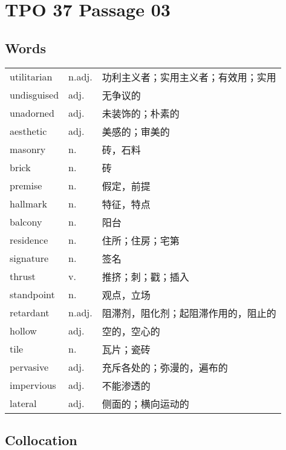 \section{TPO 37 Passage 03}

\subsection{Words}

\begin{tabular}{lll}
    utilitarian & n.adj. & 功利主义者；实用主义者；有效用；实用 \\
    undisguised & adj.   & 无争议的               \\
    unadorned   & adj.   & 未装饰的；朴素的           \\
    aesthetic   & adj.   & 美感的；审美的            \\
    masonry     & n.     & 砖，石料               \\
    brick       & n.     & 砖                  \\
    premise     & n.     & 假定，前提              \\
    hallmark    & n.     & 特征，特点              \\
    balcony     & n.     & 阳台                 \\
    residence   & n.     & 住所；住房；宅第           \\
    signature   & n.     & 签名                 \\
    thrust      & v.     & 推挤；刺；戳；插入          \\
    standpoint  & n.     & 观点，立场              \\
    retardant   & n.adj. & 阻滞剂，阻化剂；起阻滞作用的，阻止的 \\
    hollow      & adj.   & 空的，空心的             \\
    tile        & n.     & 瓦片；瓷砖              \\
    pervasive   & adj.   & 充斥各处的；弥漫的，遍布的      \\
    impervious  & adj.   & 不能渗透的              \\
    lateral     & adj.   & 侧面的；横向运动的          \\
\end{tabular}

\subsection{Collocation}

